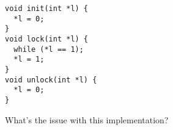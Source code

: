   \begin{slide}


    \begin{verbatim}
void init(int *l) {
  *l = 0;
}
void lock(int *l) {
  while (*l == 1);
  *l = 1;
}
void unlock(int *l) {
  *l = 0;
}   
    \end{verbatim}
    \medskip

    What's the issue with this implementation?



  \end{slide}


